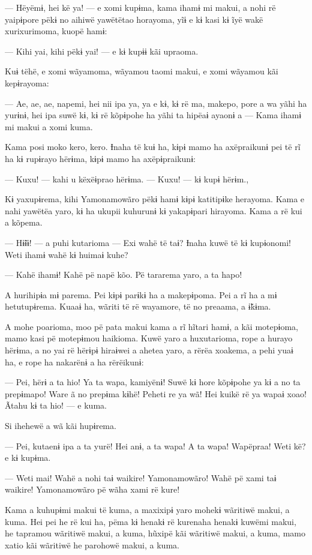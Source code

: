 --- Hëyëmɨ, hei kë ya! --- e xomi kupɨma, kama ihamɨ mi makui, a nohi rë
yaipɨpore pëkɨ no aihiwë yawëtëtao horayoma, yĩɨ e kɨ kasi kɨ ĩyë wakë
xurixurimoma, kuopë hamɨ: 

--- Kihi yai, kihi pëkɨ yai! --- e kɨ kupɨɨ kãi upraoma. 

Kuɨ tëhë, e xomi wãyamoma, wãyamou taomi makui, e xomi wãyamou kãi
kepɨrayoma: 

--- Ae, ae, ae, napemi, hei nii ipa ya, ya e kɨ, kɨ rë ma, makepo, pore
a wa yãhi ha yurɨnɨ, hei ipa suwë kɨ, kɨ rë kõpɨpohe ha yãhi ta hipëaɨ
ayaonɨ a --- Kama ihamɨ mi makui a xomi kuma. 

Kama posi moko kero, kero. Ɨnaha të kuɨ ha, kɨpɨ mamo ha axëpraikunɨ pei
të rĩ ha kɨ rupɨrayo hërɨma, kɨpɨ mamo ha axëpɨpraikunɨ:

--- Kuxu! --- kahi u këxëɨprao hërɨma. --- Kuxu! --- kɨ kupɨ hërɨm., 

Kɨ yaxupɨrema, kihi Yamonamowãro pëkɨ hamɨ kɨpɨ katitipɨke herayoma.
Kama e nahi yawëtëa yaro, kɨ ha ukupii kuhurunɨ kɨ yakapɨpari hirayoma.
Kama a rë kui a kõpema. 

--- Hɨ̃ɨɨ! --- a puhi kutarioma --- Exi wahë të taɨ? Ɨnaha kuwë të kɨ
kupɨonomi! Weti ihamɨ wahë kɨ huimaɨ kuhe?

--- Kahë ihamɨ! Kahë pë napë kõo. Pë tararema yaro, a ta hapo! 

 

A hurihipɨa mɨ parema. Pei kɨpɨ parɨkɨ ha a makepɨpoma. Pei a rĩ ha a mɨ
hetutupɨrema. Kuaaɨ ha, wãriti të rë wayamore, të no preaama, a ɨ̃kɨma. 

A mohe poarioma, moo pë pata makui kama a rĩ hĩtari hamɨ, a kãi
motepɨoma, mamo kasi pë motepɨmou haikioma. Kuwë yaro a huxutarioma,
rope a hurayo hërɨma, a no yai rë hërɨpɨ hiraɨwei a ahetea yaro, a rërëa
xoakema, a pehi yuaɨ ha, e rope ha nakarënɨ a ha rërëikunɨ:

--- Pei, hërɨ a ta hio! Ya ta wapa, kamiyënɨ! Suwë kɨ hore kõpɨpohe ya
kɨ a no ta prepɨmapo! Ware ã no prepɨma kɨhë! Peheti re ya wã! Hei kuikë
rë ya wapaɨ xoao! Ãtahu kɨ ta hio! --- e kuma. 

Si ihehewë a wã kãi hupɨrema. 

--- Pei, kutaenɨ ipa a ta yurë! Hei anɨ, a ta wapa! A ta wapa! Wapëpraa!
Weti kë? e kɨ kupɨma.

--- Weti mai! Wahë a nohi taɨ waikire! Yamonamowãro! Wahë pë xami taɨ
waikire! Yamonamowãro pë wãha xami rë kure! 

Kama a kuhupɨmi makui të kuma, a maxixipɨ yaro mohekɨ wãritiwë makui, a
kuma. Hei pei he rë kui ha, pëma kɨ henakɨ rë kurenaha henakɨ kuwëmi
makui, he tapramou wãritiwë makui, a kuma, hũxipë kãi wãritiwë makui, a
kuma, mamo xatio kãi wãritiwë he parohowë makui, a kuma. 

